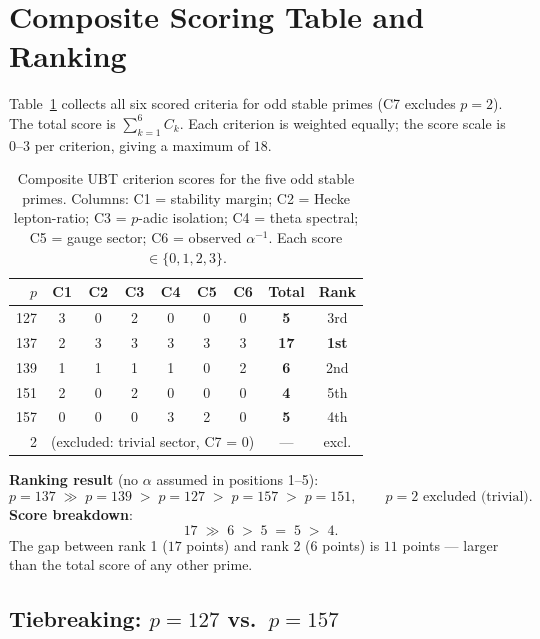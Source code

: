 \documentclass[12pt,a4paper]{article}
\theoremstyle{definition}
\theoremstyle{remark}
\begin{document}
\section{Composite Scoring Table and Ranking}
\label{sec:spr:ranking}

Table~\ref{tab:spr:scores} collects all six scored criteria for odd stable
primes (C7 excludes $p = 2$).  The total score is $\sum_{k=1}^{6} C_k$.
Each criterion is weighted equally; the score scale is $0$–$3$ per criterion,
giving a maximum of $18$.

\begin{table}[h]
\centering
\caption{Composite UBT criterion scores for the five odd stable primes.
  Columns: C1 = stability margin; C2 = Hecke lepton-ratio; C3 = $p$-adic
  isolation; C4 = theta spectral; C5 = gauge sector; C6 = observed
  $\alpha^{-1}$.  Each score $\in \{0,1,2,3\}$.}
\label{tab:spr:scores}
\begin{tabular}{rcccccccc}
\toprule
$p$ & C1 & C2 & C3 & C4 & C5 & C6 & \textbf{Total} & \textbf{Rank} \\
\midrule
127 & 3 & 0 & 2 & 0 & 0 & 0 & \textbf{5}  & 3rd \\
137 & 2 & 3 & 3 & 3 & 3 & 3 & \textbf{17} & \textbf{1st} \\
139 & 1 & 1 & 1 & 1 & 0 & 2 & \textbf{6}  & 2nd \\
151 & 2 & 0 & 2 & 0 & 0 & 0 & \textbf{4}  & 5th \\
157 & 0 & 0 & 0 & 3 & 2 & 0 & \textbf{5}  & 4th \\
\midrule
2   & \multicolumn{6}{c}{(excluded: trivial sector, C7 = 0)} & — & excl. \\
\bottomrule
\end{tabular}
\end{table}

\begin{resultbox}
\textbf{Ranking result} (no $\alpha$ assumed in positions 1–5):
\[
  p = 137 \;\gg\; p = 139 \;>\; p = 127 \;>\; p = 157 \;>\; p = 151,
  \qquad
  p = 2 \text{ excluded (trivial)}.
\]
\textbf{Score breakdown}:
\[
  17 \;\gg\; 6 \;>\; 5 \;=\; 5 \;>\; 4.
\]
The gap between rank 1 ($17$ points) and rank 2 ($6$ points) is $11$ points —
larger than the total score of any other prime.
\end{resultbox}

\subsection{Tiebreaking: $p = 127$ vs.\ $p = 157$}
\label{sec:spr:tiebreak}
\end{document}
